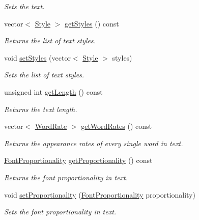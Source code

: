 \begin{CompactItemize}
\begin{CompactList}\small\item\em Sets the text. \item\end{CompactList}\item 
vector$<$ \hyperlink{class_style}{Style} $>$ \hyperlink{class_text_5d0279f5ce832a447c68b99182753928}{getStyles} () const 
\begin{CompactList}\small\item\em Returns the list of text styles. \item\end{CompactList}\item 
void \hyperlink{class_text_419c845399aa5e49e3271600fc8a812d}{setStyles} (vector$<$ \hyperlink{class_style}{Style} $>$ styles)
\begin{CompactList}\small\item\em Sets the list of text styles. \item\end{CompactList}\item 
unsigned int \hyperlink{class_text_ea91ea415ed40d6cd0aff9063d72756e}{getLength} () const 
\begin{CompactList}\small\item\em Returns the text length. \item\end{CompactList}\item 
vector$<$ \hyperlink{_word_rate_8h_e8f43926daba5798edbb3cb94ad07ff7}{WordRate} $>$ \hyperlink{class_text_2fd83be91d5ba2c24fd44df45efc92c9}{getWordRates} () const 
\begin{CompactList}\small\item\em Returns the appearance rates of every single word in text. \item\end{CompactList}\item 
\hyperlink{_font_proportionality_8h_a9aa255df24db58a9b4cbc46941f2ac1}{FontProportionality} \hyperlink{class_text_fa8149d9658fd279eb2f6c6c967b3bb5}{getProportionality} () const 
\begin{CompactList}\small\item\em Returns the font proportionality in text. \item\end{CompactList}\item 
void \hyperlink{class_text_3b2b58565dd9f580163d9efb827e995d}{setProportionality} (\hyperlink{_font_proportionality_8h_a9aa255df24db58a9b4cbc46941f2ac1}{FontProportionality} proportionality)
\begin{CompactList}\small\item\em Sets the font proportionality in text. \item\end{CompactList}\end{CompactItemize}
